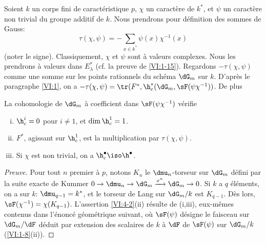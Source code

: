 Soient $k$ un corps fini de caractéristique $p$, $\chi$ un caractère de 
$k^\ast$, et $\psi$ un caractère non trivial du groupe additif de $k$. Nous 
prendrons pour définition des sommes de Gauss: 
\begin{equation*}\tag{4.1.1}\label{VI:eq:4-1-1}
  \tau(\chi,\psi) = -\sum_{x\in k^\ast} \psi(x) \chi^{-1}(x) 
\end{equation*}
(noter le signe). Classiquement, $\chi$ et $\psi$ sont à valeurs complexes. 
Nous les prendrons à valeurs dans $E_\lambda^\ast$ (cf. la preuve de 
\ref{VI:1-15}). Regardons $-\tau(\chi,\psi)$ comme une somme sur les points 
rationnels du schéma $\dG_m$ sur $k$. D'après le paragraphe \ref{VI:1}, 
on a $-\tau(\chi,\psi) = \tr(F^\ast,\h_c^\ast(\dG_m,\sF(\psi \chi^{-1}))$. De 
plus 





\begin{proposition_}\label{VI:4-2}
La cohomologie de $\dG_m$ à coefficient dans $\sF(\psi\chi^{-1})$ vérifie 
\begin{enumerate}[(i)]
  \item $\h_c^i=0$ pour $i\ne 1$, et $\dim \h_c^1=1$. 
  \item $F^\ast$, agissant sur $\h_c^1$, est la multiplication par 
    $\tau(\chi,\psi)$. 
  \item Si $\chi$ est non trivial, on a $\h_c^\bullet \iso \h^\bullet$. 
\end{enumerate}
\end{proposition_}
\begin{proof}[Preuve]
Pour tout $n$ premier à $p$, notons $K_n$ le $\dmu_n$-torseur sur $\dG_m$ 
défini par la suite exacte de Kummer 
$0 \to \dmu_n \to \dG_m \xrightarrow{x^n} \dG_m \to 0$. Si $k$ a $q$ 
éléments, on a sur $k$: $\dmu_{q-1}=k^\ast$, et le torseur de Lang sur 
$\dG_m/k$ est $K_{q-1}$. Dès lors, $\sF(\chi^{-1})=\chi(K_{q-1})$. 
L'assertion \ref{VI:4-2}(ii) résulte de (i,iii), eux-mêmes contenus dans 
l'énoncé géométrique suivant, où $\sF(\psi)$ désigne le faisceau 
sur $\dG_m/\dF$ déduit par extension des scalaires de $k$ à $\dF$ de 
$\sF(\psi)$ sur $\dG_m/k$ (\ref{VI:1-8}(ii)). 
\end{proof}





